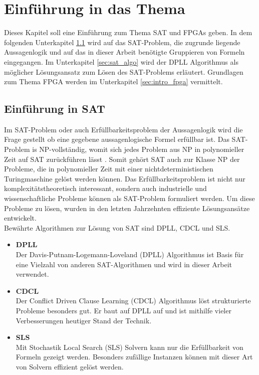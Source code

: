 \section{Einführung in das Thema}
Dieses Kapitel soll eine Einführung zum Thema SAT und 
FPGAs geben. In dem folgenden Unterkapitel
\ref{sec:intro_sat} wird auf das SAT-Problem, die 
zugrunde liegende Aussagenlogik und auf das in dieser
Arbeit benötigte Gruppieren von Formeln eingegangen.
Im Unterkapitel \ref{sec:sat_algo} wird der DPLL
Algorithmus als möglicher Lösungsansatz zum Lösen des SAT-Problems erläutert.
Grundlagen zum Thema FPGA werden im Unterkapitel 
\ref{sec:intro_fpga} vermittelt.

\subsection{Einführung in SAT}
\label{sec:intro_sat}
Im SAT-Problem oder auch Erfüllbarkeitsproblem
der Aussagenlogik wird die Frage gestellt ob eine
gegebene aussagenlogische Formel erfüllbar ist.
Das SAT-Problem is NP-vollständig, 
womit sich jedes Problem aus NP in
polynomieller Zeit auf SAT zurückführen lässt
\cite{cook:1971}. Somit gehört SAT auch zur Klasse NP
der Probleme, die in polynomieller Zeit mit einer
nichtdeterministischen Turingmaschine gelöst werden
können. Das Erfüllbarkeitsproblem ist nicht nur
komplexitätstheoretisch interessant, sondern auch
industrielle und wissenschaftliche Probleme können als
SAT-Problem formuliert werden. Um diese Probleme zu
lösen, wurden in den letzten Jahrzehnten effiziente 
Lösungsansätze entwickelt.\\
Bewährte Algorithmen zur Lösung von SAT sind DPLL, CDCL und SLS.
\begin{itemize}
\item
  \textbf{DPLL} \cite{davis:1962}\\
  Der Davis-Putnam-Logemann-Loveland (DPLL) Algorithmus
  ist Basis für eine Vielzahl von anderen
  SAT-Algorithmen und wird in dieser Arbeit verwendet.
\item
  \textbf{CDCL} \cite{mitchell:2004}\\
  Der Conflict Driven Clause Learning (CDCL) Algorithmus
  löst strukturierte Probleme besonders gut. Er baut
  auf DPLL auf und ist mithilfe vieler Verbesserungen
  heutiger Stand der Technik.
  
\item
  \textbf{SLS} \cite{hoos:2004}\\
  Mit Stochastik Local Search (SLS) Solvern kann nur
  die Erfüllbarkeit von Formeln gezeigt werden.
  Besonders zufällige Instanzen können mit dieser
  Art von Solvern effizient gelöst werden.
\end{itemize}


